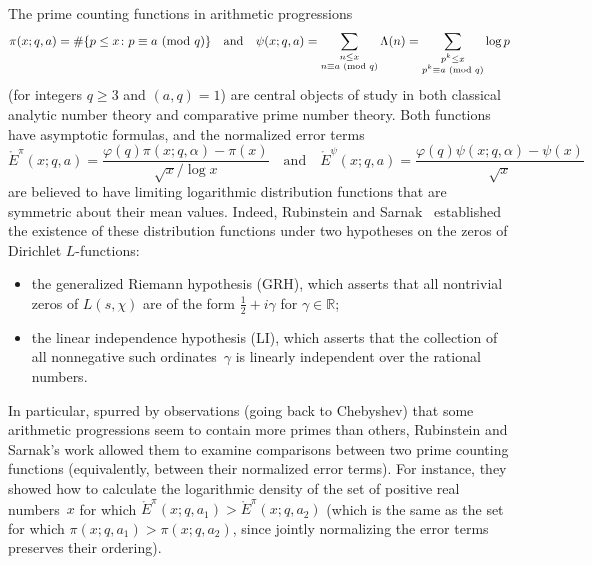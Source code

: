 \documentclass[11pt]{article}
\theoremstyle{plain}
\theoremstyle{definition}
\numberwithin{equation}{section}
\renewcommand{\mod}[1]{{\ifmmode\text{\rm\ (mod~$#1$)}\else\discretionary{}{}{\hbox{\!\!}}\rm(mod~$#1$)\fi}}
\newcommand{\Edot}{\mathord{\mathring E}}
\newcommand{\R}{\mathbb R}
\newcommand{\p}{\mathcal P}
\newcommand{\0}{{\vec 0}}
\begin{document}
The prime counting functions in arithmetic progressions
\[
\pi(x;q,a) = \#\{ p\le x\colon p\equiv a\mod q\}
\quad\text{and}\quad
\psi(x;q,a) = \sum_{\substack{n\le x\\n\equiv a\mod q}}\Lambda(n)=\sum_{\substack{p^k\le x\\p^k\equiv a\mod q}}\log p
\]
(for integers $q\ge3$ and $(a,q)=1$) are central objects of study in both classical analytic number theory and comparative prime number theory. Both functions have asymptotic formulas, and the normalized error terms
\begin{equation} \label{NETs}
\Edot^\pi(x;q,a) = \frac{\varphi(q)\pi(x;q,\alpha)-\pi(x)}{\sqrt{x}/\log x}
\quad\text{and}\quad
\Edot^\psi(x;q,a) = \frac{\varphi(q)\psi(x;q,\alpha)-\psi(x)}{\sqrt{x}}
\end{equation}
are believed to have limiting logarithmic distribution functions that are symmetric about their mean values. Indeed, Rubinstein and Sarnak~\cite{RS94} established the existence of these distribution functions under two hypotheses on the zeros of Dirichlet $L$-functions:
\begin{itemize}\setlength\itemsep{0pt}
\item the generalized Riemann hypothesis (GRH), which asserts that all nontrivial zeros of $L(s,\chi)$ are of the form $\frac12+i\gamma$ for $\gamma\in\R$;
\item the linear independence hypothesis (LI), which asserts that the collection of all nonnegative such ordinates~$\gamma$ is linearly independent over the rational numbers.
\end{itemize}
In particular, spurred by observations (going back to Chebyshev) that some arithmetic progressions seem to contain more primes than others, Rubinstein and Sarnak's work allowed them to examine comparisons between two prime counting functions (equivalently, between their normalized error terms). For instance, they showed how to calculate the logarithmic density of the set of positive real numbers~$x$ for which $\Edot^\pi(x;q,a_1) > \Edot^\pi(x;q,a_2)$ (which is the same as the set for which $\pi(x;q,a_1) > \pi(x;q,a_2)$, since jointly normalizing the error terms preserves their ordering).
\end{document}
